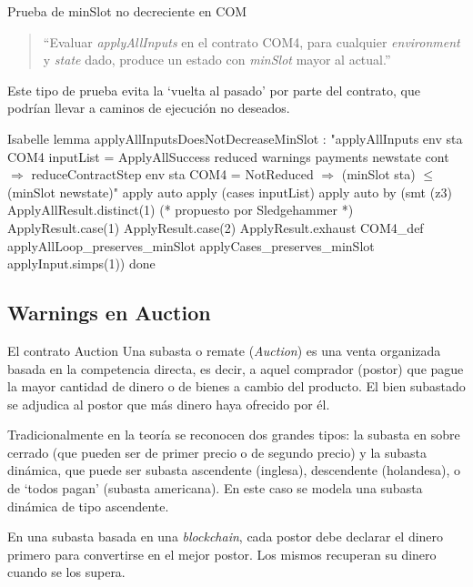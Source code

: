 \documentclass{beamer}
\begin{document}
\begin{frame}{Prueba de minSlot no decreciente en COM}
\begin{quote} 
``Evaluar \textit{applyAllInputs} en el contrato COM4, para cualquier \textit{environment} y \textit{state} dado, produce un estado con \textit{minSlot} mayor al actual.''
\end{quote}

\vfill

Este tipo de prueba evita la `vuelta al pasado' por parte del contrato, que podrían llevar a caminos de ejecución no deseados.

\end{frame}

\begin{frame}[fragile]

\begin{code}[title=Prueba del lema de \textit{minSlot} para un contrato COM.]{Isabelle}
lemma applyAllInputsDoesNotDecreaseMinSlot :
"applyAllInputs env sta COM4 inputList = 
    ApplyAllSuccess reduced warnings payments newstate cont $\Longrightarrow$
    reduceContractStep env sta COM4 = NotReduced $\Longrightarrow$
  (minSlot sta) $\leq$ (minSlot newstate)"
  apply auto
  apply (cases inputList)
  apply auto 
  by (smt (z3) ApplyAllResult.distinct(1) (* propuesto por Sledgehammer *)
                  ApplyResult.case(1)
                  ApplyResult.case(2)
                  ApplyResult.exhaust
                  COM4_def
                  applyAllLoop_preserves_minSlot
                  applyCases_preserves_minSlot applyInput.simps(1))
  done
\end{code}

\end{frame}

\subsection{Warnings en Auction}

\begin{frame}{El contrato Auction}
Una subasta o remate (\textit{Auction}) es una venta organizada basada en la competencia directa, es decir, a aquel comprador (postor) que pague la mayor cantidad de dinero o de bienes a cambio del producto. El bien subastado se adjudica al postor que más dinero haya ofrecido por él.

\medskip
\pause

Tradicionalmente en la teoría se reconocen dos grandes tipos: la subasta en sobre cerrado (que pueden ser de primer precio o de segundo precio) y la subasta dinámica, que puede ser subasta ascendente (inglesa), descendente (holandesa), o de `todos pagan' (subasta americana). En este caso se modela una subasta dinámica de tipo ascendente.

\medskip
\pause

En una subasta basada en una \textit{blockchain}, cada postor debe declarar el dinero primero para convertirse en el mejor postor. Los mismos recuperan su dinero cuando se los supera.

\end{frame}
\end{document}
